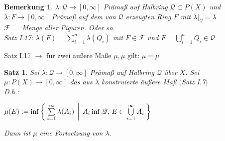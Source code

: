 \documentclass[11pt]{memoir}
\theoremstyle{changebreak}
\newtheorem{Bemerkung}{Bemerkung}[chapter]
\newtheorem{Satz}{Satz}[chapter]
\begin{document}
\begin{Bemerkung}
$\lambda: \mathscr Q \rightarrow [0, \infty]$ Prämaß auf Halbring $\mathscr Q \subset P(X)$ und $\overline{\lambda} : F \rightarrow [0, \infty]$ Prämaß auf dem von $\mathscr Q$ erzeugten Ring $F$ mit $\overline{\lambda}|_\mathscr Q = \lambda$ \\

$\mathscr  F =$ Menge aller Figuren. Oder so. \\

Satz I.17: $\overline{\lambda}(F) = \sum\limits_{i=1}^n \lambda(Q_i)$ mit $F \in \mathscr F$ und $F = \bigcup\limits_{i=1}^n Q_i \in \mathscr Q$

\end{Bemerkung}

Satz I.17 $\rightarrow$ für zwei äußere Maße $\mu, \overline{\mu}$ gilt: $\mu = \overline{\mu}$


\begin{Satz}
Sei $\lambda: \mathscr Q \rightarrow [0, \infty]$ Prämaß auf Halbring $\mathscr Q$ über $X$. Sei $\mu: P(X) \rightarrow [0, \infty]$ das aus $\lambda$ konstruierte äußere Maß $($Satz I.7$)$ \\
D.h.:
\begin{center}
	$\mu(E) := \inf\Set{\sum\limits_{i=1}^\infty \lambda(A_i) \, |\, A_i \inf\mathscr Q, \, E \subset \bigcup\limits_{i=1}^\infty A_i }$
\end{center}
Dann ist $\mu$ eine Fortsetzung von $\lambda$.
\end{Satz}
\end{document}
